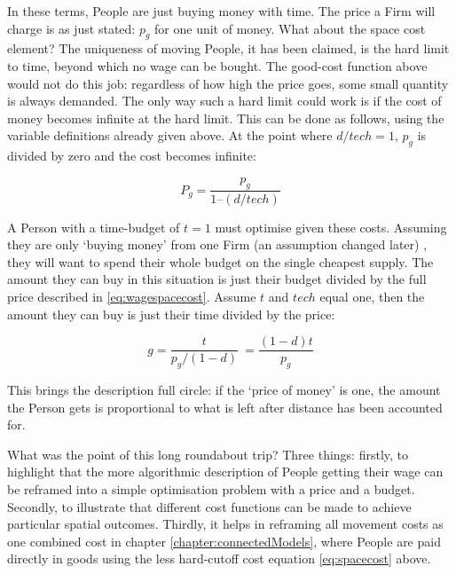 In these terms, People are just buying money with time. The price a Firm will charge is as just stated: $p_g$ for one unit of money. What about the space cost element? The uniqueness of moving People, it has been claimed, is the hard limit to time, beyond which no wage can be bought. The good-cost function above would not do this job: regardless of how high the price goes, some small quantity is always demanded. The only way such a hard limit could work is if the cost of money becomes infinite at the hard limit. This can be done as follows, using the variable definitions already given above. At the point where $d/tech = 1$, $p_g$ is divided by zero and the cost becomes infinite:

\begin{equation}
P_g = \frac{p_g}{1 – (d/tech)}\label{eq:wagespacecost}
\end{equation}

A Person with a time-budget of $t=1$ must optimise given these costs. Assuming they are only `buying money' from one Firm (an assumption changed later) , they will want to spend their whole budget on the single cheapest supply. The amount they can buy in this situation is just their budget divided by the full price described in \eqref{eq:wagespacecost}. Assume $t$ and $tech$ equal one, then the amount they can buy is just their time divided by the price:

\begin{equation}
g = \frac{t}{p_g/(1-d)}\ = \frac{(1-d)t}{p_g}
\end{equation}

This brings the description full circle: if the `price of money' is one, the amount the Person gets is proportional to what is left after distance has been accounted for. 

What was the point of this long roundabout trip? Three things: firstly, to highlight that the more algorithmic description of People getting their wage can be reframed into a simple optimisation problem with a price and a budget. Secondly, to illustrate that different cost functions can be made to achieve particular spatial outcomes. Thirdly, it helps in reframing all movement costs as one combined cost in chapter \ref{chapter:connectedModels}, where People are paid directly in goods using the less hard-cutoff cost equation \eqref{eq:spacecost} above.

